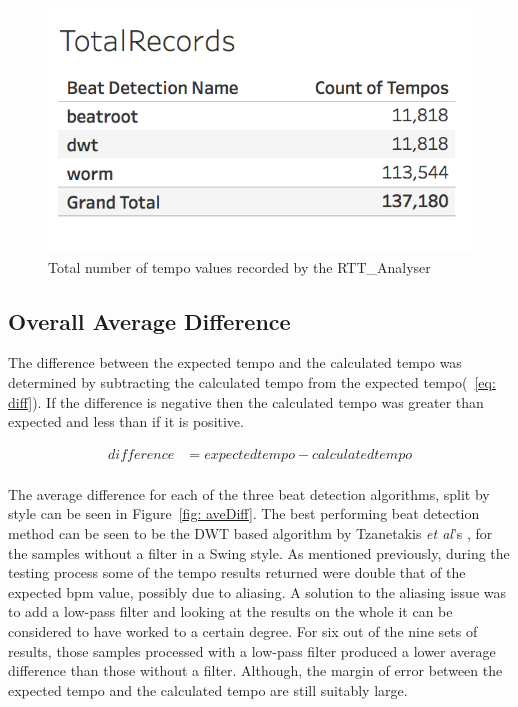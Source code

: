 \documentclass[a4paper, 11pt]{article}
\begin{document}
\begin{figure}
\centering
\includegraphics[scale=0.3]{totRec.jpg}
\caption{Total number of tempo values recorded by the RTT\_Analyser}
\label{fig: totrec}
\end{figure}

\subsection{Overall Average Difference}
The difference between the expected tempo and the calculated tempo was determined by subtracting the calculated tempo from the expected tempo(~\ref{eq: diff}). If the difference is negative then the calculated tempo was greater than expected and less than if it is positive.

\begin{equation}\label{eq: diff}
\begin{split}
difference& =expected tempo - calculated tempo\\
\end{split}
\end{equation}

The average difference for each of the three beat detection algorithms, split by style can be seen in Figure~\ref{fig: aveDiff}. The best performing beat detection method can be seen to be the DWT based algorithm by Tzanetakis \textit{et al}'s \cite{tzane1}, for the samples without a filter in a Swing style. As mentioned previously, during the testing process some of the tempo results returned were double that of the expected bpm value, possibly due to aliasing. A solution to the aliasing issue was to add a low-pass filter and looking at the results on the whole it can be considered to have worked to a certain degree. For six out of the nine sets of results, those samples processed with a low-pass filter produced a lower average difference than those without a filter. Although, the margin of error between the expected tempo and the calculated tempo are still suitably large.\par
\end{document}
